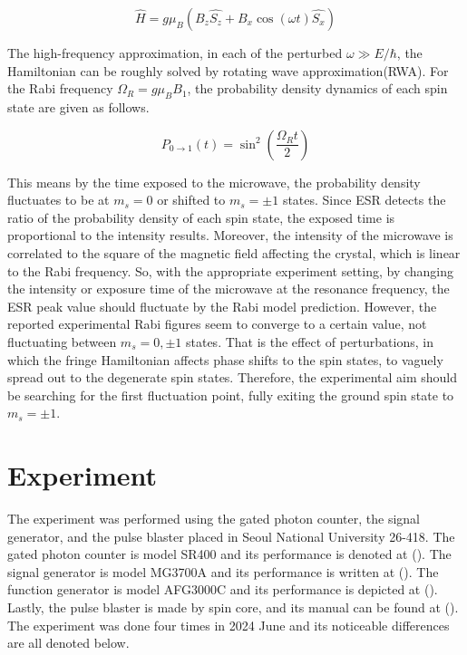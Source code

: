 \documentclass{article}
\begin{document}
\begin{equation}
    \hat{H} = g\mu_B \left( B_z \hat{S_z} + B_x \cos(\omega t) \hat{S_x} \right)
\end{equation}

The high-frequency approximation, in each of the perturbed $\omega \gg E/\hbar$, the Hamiltonian can be roughly solved by rotating wave approximation(RWA).
For the Rabi frequency $\Omega_R = g\mu_B B_1$, the probability density dynamics of each spin state are given as follows.

\begin{equation}
    P_{0\rightarrow1} (t) = \sin^2\left(\frac{\Omega_R t}{2}\right)
\end{equation}

This means by the time exposed to the microwave, the probability density fluctuates to be at $m_s = 0$ or shifted to $m_s = \pm1$ states.
Since ESR detects the ratio of the probability density of each spin state, the exposed time is proportional to the intensity results.
Moreover, the intensity of the microwave is correlated to the square of the magnetic field affecting the crystal, which is linear to the Rabi frequency.
So, with the appropriate experiment setting, by changing the intensity or exposure time of the microwave at the resonance frequency, the ESR peak value should fluctuate by the Rabi model prediction.
However, the reported experimental Rabi figures seem to converge to a certain value, not fluctuating between $m_s = 0, \pm 1$ states.
That is the effect of perturbations, in which the fringe Hamiltonian affects phase shifts to the spin states, to vaguely spread out to the degenerate spin states.
Therefore, the experimental aim should be searching for the first fluctuation point, fully exiting the ground spin state to $m_s = \pm 1$.

\section{Experiment}
\label{section: experiment}
The experiment was performed using the gated photon counter, the signal generator, and the pulse blaster placed in Seoul National University 26-418.
The gated photon counter is model SR400 and its performance is denoted at (\cite{photoncounter}).
The signal generator is model MG3700A and its performance is written at (\cite{signalgenerator}).
The function generator is model AFG3000C and its performance is depicted at (\cite{functiongenerator}).
Lastly, the pulse blaster is made by spin core, and its manual can be found at (\cite{pulseblaster}).
The experiment was done four times in 2024 June and its noticeable differences are all denoted below.
\end{document}
